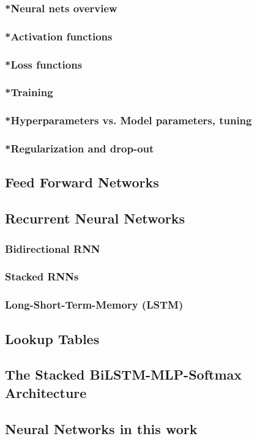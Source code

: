 \subsubsection{*Neural nets overview}
\subsubsection{*Activation functions}
\subsubsection{*Loss functions}
\subsubsection{*Training}
\subsubsection{*Hyperparameters vs. Model parameters, tuning}
\subsubsection{*Regularization and drop-out}
\subsection{Feed Forward Networks}
\subsection{Recurrent Neural Networks}
\subsubsection{Bidirectional RNN}
\subsubsection{Stacked RNNs}
\subsubsection{Long-Short-Term-Memory (LSTM)}
\subsection{Lookup Tables}
\subsection{The Stacked BiLSTM-MLP-Softmax Architecture}
\subsection{Neural Networks in this work}
\pagebreak

